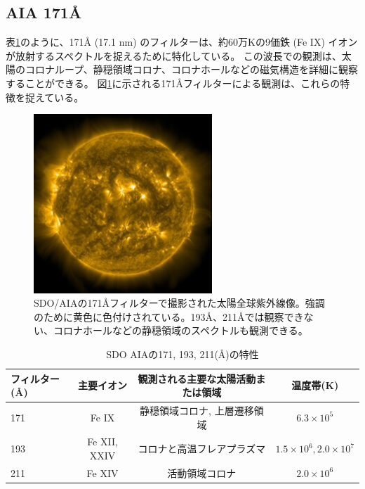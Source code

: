 \subsection{AIA 171Å}
    表\ref{table:aia_filters_details}のように、171Å (17.1 nm) のフィルターは、約60万Kの9価鉄 (Fe IX) イオンが放射するスペクトルを捉えるために特化している。
    この波長での観測は、太陽のコロナループ、静穏領域コロナ、コロナホールなどの磁気構造を詳細に観察することができる。
    図\ref{fig:sample_aia171}に示される171Åフィルターによる観測は、これらの特徴を捉えている。
    \begin{figure}[h]
        \centering
        \includegraphics[width=0.6\textwidth]{figures/data/latest_256_0171.jpg}
        \caption{SDO/AIAの171Åフィルターで撮影された太陽全球紫外線像。強調のために黄色に色付けされている。193Å、211Åでは観察できない、コロナホールなどの静穏領域のスペクトルも観測できる。}
        \label{fig:sample_aia171}
    \end{figure}

\begin{table}[hptb]
    \centering
    \caption{SDO AIAの171, 193, 211(\AA)の特性}
    \begin{tabular}{lccc}
    \hline
    \textbf{フィルター (\AA)} & \textbf{主要イオン} & \textbf{観測される主要な太陽活動または領域} & \textbf{温度帯(K)}  \\ \hline
    171 & Fe IX & 静穏領域コロナ, 上層遷移領域 & \(6.3 \times 10^{5} \) \\ \hline
    193 & Fe XII, XXIV & コロナと高温フレアプラズマ & \(1.5 \times 10^6, 2.0 \times 10^7 \)  \\ \hline
    211 & Fe XIV & 活動領域コロナ & \(2.0 \times 10^6\) \\ \hline
    \end{tabular}
    \label{table:aia_filters_details}
\end{table}

